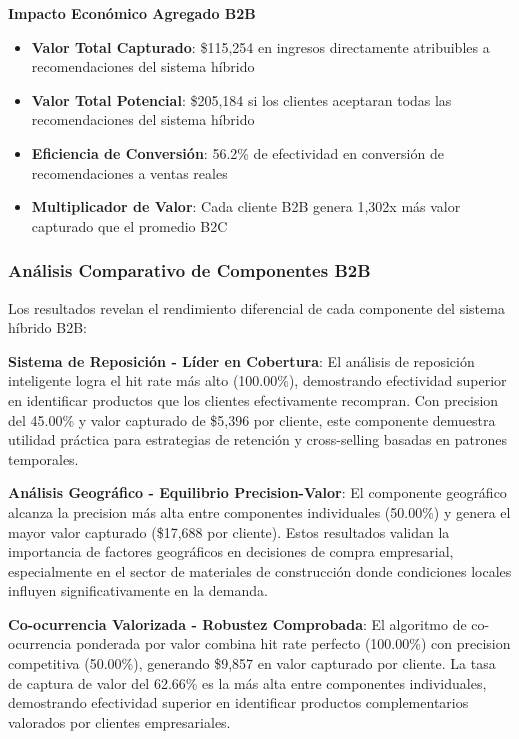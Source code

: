 \documentclass[twocolumn]{article}
\begin{document}
\textbf{Impacto Económico Agregado B2B}

\begin{itemize}
    \item \textbf{Valor Total Capturado}: \$115,254 en ingresos directamente atribuibles a recomendaciones del sistema híbrido
    \item \textbf{Valor Total Potencial}: \$205,184 si los clientes aceptaran todas las recomendaciones del sistema híbrido
    \item \textbf{Eficiencia de Conversión}: 56.2\% de efectividad en conversión de recomendaciones a ventas reales
    \item \textbf{Multiplicador de Valor}: Cada cliente B2B genera 1,302x más valor capturado que el promedio B2C
\end{itemize}

\subsubsection{Análisis Comparativo de Componentes B2B}

Los resultados revelan el rendimiento diferencial de cada componente del sistema híbrido B2B:

\textbf{Sistema de Reposición - Líder en Cobertura}: El análisis de reposición inteligente logra el hit rate más alto (100.00\%), demostrando efectividad superior en identificar productos que los clientes efectivamente recompran. Con precision del 45.00\% y valor capturado de \$5,396 por cliente, este componente demuestra utilidad práctica para estrategias de retención y cross-selling basadas en patrones temporales.

\textbf{Análisis Geográfico - Equilibrio Precision-Valor}: El componente geográfico alcanza la precision más alta entre componentes individuales (50.00\%) y genera el mayor valor capturado (\$17,688 por cliente). Estos resultados validan la importancia de factores geográficos en decisiones de compra empresarial, especialmente en el sector de materiales de construcción donde condiciones locales influyen significativamente en la demanda.

\textbf{Co-ocurrencia Valorizada - Robustez Comprobada}: El algoritmo de co-ocurrencia ponderada por valor combina hit rate perfecto (100.00\%) con precision competitiva (50.00\%), generando \$9,857 en valor capturado por cliente. La tasa de captura de valor del 62.66\% es la más alta entre componentes individuales, demostrando efectividad superior en identificar productos complementarios valorados por clientes empresariales.
\end{document}
